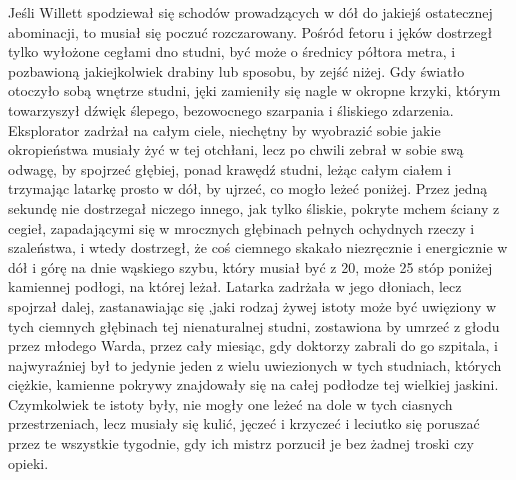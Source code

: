 Jeśli Willett spodziewał się schodów prowadzących w dół do jakiejś ostatecznej abominacji, to musiał się poczuć rozczarowany. Pośród fetoru i jęków dostrzegł tylko wyłożone cegłami dno studni, być może o średnicy półtora metra, i pozbawioną jakiejkolwiek drabiny lub sposobu, by zejść niżej. Gdy światło otoczyło sobą wnętrze studni, jęki zamieniły się nagle w okropne krzyki, którym towarzyszył dźwięk ślepego, bezowocnego szarpania i śliskiego zdarzenia. Eksplorator zadrżał na całym ciele, niechętny by wyobrazić sobie jakie okropieństwa musiały żyć w tej otchłani, lecz po chwili zebrał w sobie swą odwagę, by spojrzeć głębiej, ponad krawędź studni, leżąc całym ciałem i trzymając latarkę prosto w dół, by ujrzeć, co mogło leżeć poniżej. Przez jedną sekundę nie dostrzegał niczego innego, jak tylko śliskie, pokryte mchem ściany z cegieł, zapadającymi się w mrocznych głębinach pełnych ochydnych rzeczy i szaleństwa, i wtedy dostrzegł, że coś ciemnego skakało niezręcznie i energicznie w dół i górę na dnie wąskiego szybu, który musiał być z 20, może 25 stóp poniżej kamiennej podłogi, na której leżał. Latarka zadrżała w jego dłoniach, lecz spojrzał dalej, zastanawiając się ,jaki rodzaj żywej istoty może być uwięziony w tych ciemnych głębinach tej nienaturalnej studni, zostawiona by umrzeć z głodu przez młodego Warda, przez cały miesiąc, gdy doktorzy zabrali do go szpitala, i najwyraźniej był to jedynie jeden z wielu uwiezionych w tych studniach, których ciężkie, kamienne pokrywy znajdowały się na całej podłodze tej wielkiej jaskini. Czymkolwiek te istoty były, nie mogły one leżeć na dole w tych ciasnych przestrzeniach, lecz musiały się kulić, jęczeć i krzyczeć i leciutko się poruszać przez te wszystkie tygodnie, gdy ich mistrz porzucił je bez żadnej troski czy opieki. 

